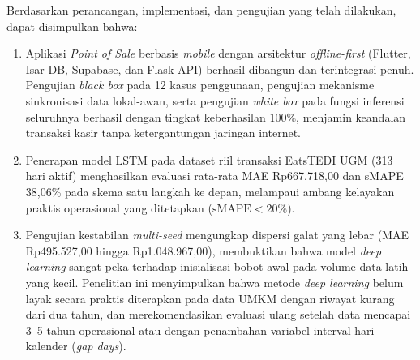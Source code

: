 \documentclass[10pt,a4paper]{article}
\begin{document}
Berdasarkan perancangan, implementasi, dan pengujian yang telah dilakukan, dapat disimpulkan bahwa:
\begin{enumerate}
  \item Aplikasi \textit{Point of Sale} berbasis \textit{mobile} dengan arsitektur \textit{offline-first} (Flutter, Isar DB, Supabase, dan Flask API) berhasil dibangun dan terintegrasi penuh. Pengujian \textit{black box} pada 12 kasus penggunaan, pengujian mekanisme sinkronisasi data lokal-awan, serta pengujian \textit{white box} pada fungsi inferensi seluruhnya berhasil dengan tingkat keberhasilan $100\%$, menjamin keandalan transaksi kasir tanpa ketergantungan jaringan internet.
  \item Penerapan model LSTM pada dataset riil transaksi EatsTEDI UGM (313 hari aktif) menghasilkan evaluasi rata-rata MAE Rp667.718,00 dan sMAPE 38,06\% pada skema satu langkah ke depan, melampaui ambang kelayakan praktis operasional yang ditetapkan ($\text{sMAPE} < 20\%$).
  \item Pengujian kestabilan \textit{multi-seed} mengungkap dispersi galat yang lebar (MAE Rp495.527,00 hingga Rp1.048.967,00), membuktikan bahwa model \textit{deep learning} sangat peka terhadap inisialisasi bobot awal pada volume data latih yang kecil. Penelitian ini menyimpulkan bahwa metode \textit{deep learning} belum layak secara praktis diterapkan pada data UMKM dengan riwayat kurang dari dua tahun, dan merekomendasikan evaluasi ulang setelah data mencapai 3--5 tahun operasional atau dengan penambahan variabel interval hari kalender (\textit{gap days}).
\end{enumerate}
\end{document}
